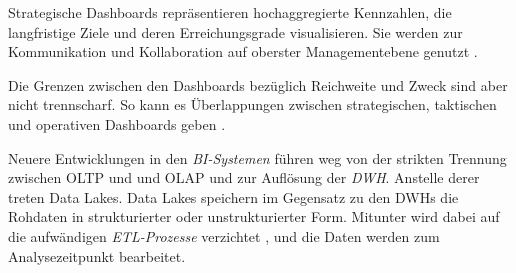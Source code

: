 Strategische Dashboards repräsentieren hochaggregierte Kennzahlen, die langfristige Ziele und deren Erreichungsgrade visualisieren. 
Sie werden zur Kommunikation und Kollaboration auf oberster Managementebene genutzt \cite[vgl.][155 f.]{linden_geschaftsmodellbasierte_2016}. 


Die Grenzen zwischen den Dashboards bezüglich Reichweite und Zweck sind aber nicht trennscharf. 
So kann es Überlappungen zwischen strategischen, taktischen und operativen Dashboards geben \cite[vgl.][121]{eckerson_performance_2011}.


Neuere Entwicklungen in den \textit{\acrshort{BI}-Systemen} führen weg von der strikten Trennung zwischen \acrshort{OLTP} und und \acrshort{OLAP} und zur Auflösung der \textit{\acrshort{DWH}}. 
Anstelle derer treten Data Lakes. Data Lakes speichern im Gegensatz zu den \acrlong{DWH}s die Rohdaten in strukturierter oder unstrukturierter Form. 
Mitunter wird dabei auf die aufwändigen \textit{\acrshort{ETL}-Prozesse} verzichtet \cite[vgl.][86]{gronwald_integrierte_2020}, und die Daten werden zum Analysezeitpunkt bearbeitet.










